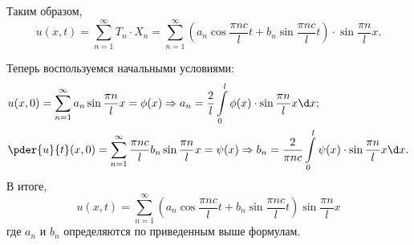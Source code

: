Таким образом, 
\[ 
	u(x, t) = \sum_{n=1}^{\infty}T_n\cdot X_n = \sum_{n=1}^{\infty}
	\left( a_n\cos\frac{\pi nc}{l}t + b_n\sin\frac{\pi nc}{l}t \right)
	\cdot\sin\frac{\pi n}{l}x.
\]

Теперь воспользуемся начальными условиями:
\begin{align*}
	& u(x, 0) = \sum_{n=1}^{\infty} a_n\sin\frac{\pi n}{l}x = \phi(x)
	\Rightarrow a_n = \frac{2}{l} \int\limits_0^l \phi(x)\cdot
	\sin\frac{\pi n}{l}x\d x; \\
	& \pder{u}{t}(x, 0) = \sum_{n=1}^{\infty} \frac{\pi nc}{l}
	b_n\sin\frac{\pi n}{l}x = \psi(x) \Rightarrow b_n = \frac{2}{\pi nc}
	\int\limits_0^l \psi(x)\cdot\sin\frac{\pi n}{l}x\d x.
\end{align*}
В итоге, 
\[
	u(x, t) = \sum_{n=1}^{\infty}\left( a_n\cos\frac{\pi nc}{l}t + 
	b_n\sin\frac{\pi nc}{l}t \right)\sin\frac{\pi n}{l}x
\]
где \( a_n \) и \( b_n \) определяются по приведенным выше формулам.

\newpage

